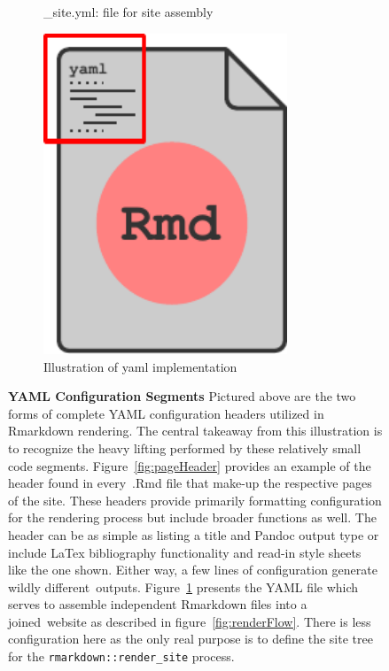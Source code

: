 \documentclass[10pt]{report}
\begin{document}
\begin{figure}
\begin{subfigure}[t]{.3\textwidth}
        \caption{\_site.yml: file for site assembly}\label{fig:siteYaml}
    \end{subfigure}
    \hspace{2em}
    \begin{subfigure}[t]{.2\textwidth}
        \center{}
        \includegraphics[width=0.8\textwidth]{fig/yaml_illustration.pdf}
        \caption{Illustration of yaml implementation}\label{fig:yamlIllust}
    \end{subfigure}
    \caption[YAML Configuration Segments]{\textbf{YAML Configuration Segments} Pictured above are the two forms of complete YAML configuration headers utilized in Rmarkdown rendering. The central takeaway from this illustration is to recognize the heavy lifting performed by these relatively small code segments. Figure~\ref{fig:pageHeader} provides an example of the header found in every~.Rmd file that make-up the respective pages of the site. These headers provide primarily formatting configuration for the rendering process but include broader functions as well. The header can be as simple as listing a title and Pandoc output type or include LaTex bibliography functionality and read-in style sheets like the one shown. Either way, a few lines of configuration generate wildly different outputs. Figure~\ref{fig:siteYaml} presents the YAML file which serves to assemble independent Rmarkdown files into a joined website as described in figure~\ref{fig:renderFlow}. There is less configuration here as the only real purpose is to define the site tree for the \texttt{rmarkdown::render\_site} process.}\label{fig:yamls}
\end{figure}
\end{document}
